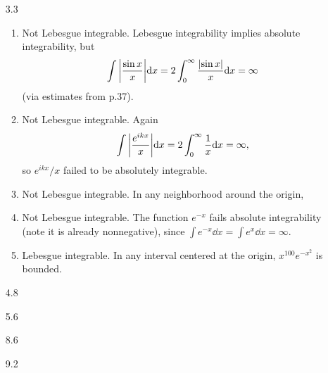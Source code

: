 \documentclass[11pt]{article}
\begin{document}
\begin{enumerate}
    \item[3.3] \begin{enumerate}
        \item Not Lebesgue integrable. Lebesgue integrability implies absolute integrability, but \[\int \abs{\frac{\sin x}{x}}\dd x = 2\int_0^\infty \frac{\abs{\sin x}}{x}\dd x = \infty\] (via estimates from p.37).
        \item Not Lebesgue integrable. Again \[\int \abs{\frac{e^{ikx}}{x}}\dd x = 2\int_0^\infty \frac{1}{x}\dd x=\infty ,\] so $e^{ikx}/x$ failed to be absolutely integrable.
        \item Not Lebesgue integrable. In any neighborhood around the origin, 
        \item Not Lebesgue integrable. The function $e^{-x}$ fails absolute integrability (note it is already nonnegative), since $\int e^{-x}\dd x = \int e^x \dd x = \infty$.
        \item Lebesgue integrable. In any interval centered at the origin, $x^{100}e^{-x^2}$ is bounded. 
    \end{enumerate}
    \item[4.8]
    \item[5.6]
    \item[8.6]
    \item[9.2]
\end{enumerate}
\vspace*{7em}
\end{document}
